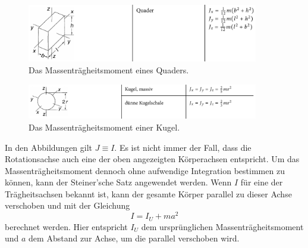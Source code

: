 \begin{figure}
    \centering
    \includegraphics[width=0.9\textwidth]{plots/TrägheitQuader.png}
    \caption{Das Massenträgheitsmoment eines Quaders.\cite{taschenbuch}}
    \label{fig:traegQuader}
\end{figure}

\begin{figure}
    \centering
    \includegraphics[width=0.9\textwidth]{plots/TrägheitKugel.png}
    \caption{Das Massenträgheitsmoment einer Kugel.\cite{taschenbuch}}
    \label{fig:traegKug}
\end{figure}

In den Abbildungen gilt $J \equiv I$.
Es ist nicht immer der Fall, dass die Rotationsachse auch eine der oben angezeigten Körperachsen entspricht.
Um das Massenträgheitsmoment dennoch ohne aufwendige Integration bestimmen zu können, kann der Steiner'sche
Satz angewendet werden. Wenn $I$ für eine der Trägheitsachsen bekannt ist, kann der gesamte Körper parallel
zu dieser Achse verschoben und mit der Gleichung
\begin{equation}
    I = I_U + ma^2
\end{equation}
berechnet werden. Hier entspricht $I_U$ dem ursprünglichen Massenträgheitsmoment und $a$ dem Abstand zur Achse, um die 
parallel verschoben wird.
